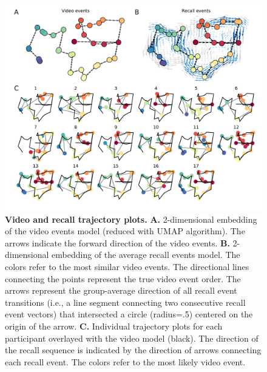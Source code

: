 \documentclass{article}
\begin{document}
\begin{figure}[t!]
\centering
\includegraphics[width=1\textwidth]{figs/3_trajectory.pdf}
\caption{\small \textbf{Video and recall trajectory plots.} \textbf{A.} 2-dimensional embedding of the video events model (reduced with UMAP algorithm). The arrows indicate the forward direction of the video events. \textbf{B.} 2-dimensional embedding of the average recall events model.  The colors refer to the most similar video events. The directional lines connecting the points represent the true video event order. The arrows represent the group-average direction of all recall event transitions (i.e., a line segment connecting two consecutive recall event vectors) that intersected a circle (radius=.5) centered on the origin of the arrow. \textbf{C.} Individual trajectory plots for each participant overlayed with the video model (black). The direction of the recall sequence is indicated by the direction of arrows connecting each recall event.  The colors refer to the most likely video event.}
\label{fig:trajectory}
\end{figure}
\end{document}
